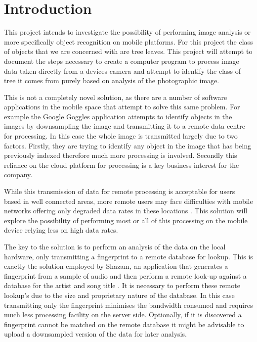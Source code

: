 \chapter{Introduction}

This project intends to investigate the possibility of performing image analysis or more specifically object recognition on mobile platforms. For this project the class of objects that we are concerned with are tree leaves. This project will attempt to document the steps necessary to create a computer program to process image data taken directly from a devices camera and attempt to identify the class of tree it comes from purely based on analysis of the photographic image.

This is not a completely novel solution, as there are a number of software applications in the mobile space that attempt to solve this same problem. For example the Google Goggles\textsuperscript{\texttrademark} application attempts to identify objects in the images by downsampling the image and transmitting it to a remote data centre for processing. In this case the whole image is transmitted largely due to two factors. Firstly, they are trying to identify any object in the image that has being previously indexed therefore much more processing is involved. Secondly this reliance on the cloud platform for processing is a key business interest for the company.

While this transmission of data for remote processing is acceptable for users based in well connected areas, more remote users may face difficulties with mobile networks offering only degraded data rates in these locations \cite{iia08}. This solution will explore the possibility of performing most or all of this processing on the mobile device relying less on high data rates.

The key to the solution is to perform an analysis of the data on the local hardware, only transmitting a fingerprint to a remote database for lookup. This is exactly the solution employed by Shazam, an application that generates a fingerprint from a sample of audio and then perform a remote look-up against a database for the artist and song title \cite{wang03}. It is necessary to perform these remote lookup’s due to the size and proprietary nature of the database. In this case transmitting only the fingerprint minimises the bandwidth consumed and requires much less processing facility on the server side. Optionally, if it is discovered a fingerprint cannot be matched on the remote database it might be advisable to upload a downsampled version of the data for later analysis.

